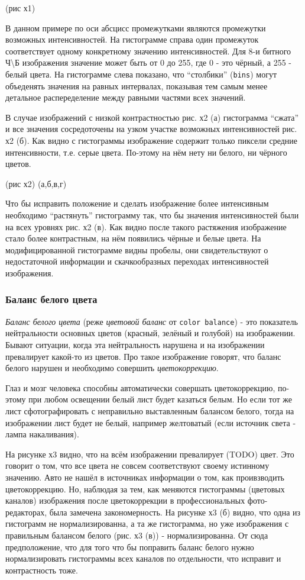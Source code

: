 \documentclass[12pt]{report}
\begin{document}
(рис х1)

В данном примере по оси абсцисс промежутками являются промежутки возможных интенсивностей. На гистограмме справа один промежуток соответствует одному конкретному значению интенсивностей. Для 8-и битного Ч\textbackslash{}Б изображения значение может быть от 0 до 255, где 0 - это чёрный, а 255 - белый цвета. На гистограмме слева показано, что ``столбики'' (\texttt{bins}) могут объеденять значения на равных интервалах, показывая тем самым менее детальное распеределение между равными частями всех значений.

В случае изображений с низкой контрастностью рис. х2 (а) гистограмма ``сжата'' и все значения сосредоточены на узком участке возможных интенсивностей рис. х2 (б). Как видно с гистограммы изображение содержит только пиксели средние интенсивности, т.е. серые цвета. По-этому на нём нету ни белого, ни чёрного цветов.

(рис х2) (а,б,в,г)

Что бы исправить положение и сделать изображение более интенсивным необходимо ``растянуть'' гистограмму так, что бы значения интенсивностей были на всех уровнях рис. х2 (в). Как видно после такого растяжения изображение стало более контрастным, на нём появились чёрные и белые цвета. На модифицированной гистограмме видны пробелы, они свидетельствуют о недостаточной информации и скачкообразных переходах интенсивностей изображения.

\subsubsection{Баланс белого цвета}

\emph{Баланс белого цвета} (реже \emph{цветовой баланс} от \texttt{color balance}) - это показатель нейтральности основных цветов (красный, зелёный и голубой) на изображении. Бывают ситуации, когда эта нейтральность нарушена и на изображении превалирует какой-то из цветов. Про такое изображение говорят, что баланс белого нарушен и необходимо совершить \emph{цветокоррекцию}. 

Глаз и мозг человека способны автоматически совершать цветокоррекцию, по-этому при любом освещении белый лист будет казаться белым. Но если тот же лист сфотографировать с неправильно выставленным балансом белого, тогда на изображении лист будет не белый, например желтоватый (если источник света - лампа накаливания).

На рисунке х3 видно, что на всём изображении превалирует (TODO) цвет. Это говорит о том, что все цвета не совсем соответствуют своему истинному значению. Авто не нашёл  в источниках информации о том, как проивзводить цветокоррекцию. Но, наблюдая за тем, как меняются гистограммы (цветовых каналов) изображения после цветокоррекции в профессиональных фото-редакторах, была замечена закономерность. На рисунке х3 (б) видно, что одна из гистограмм не нормализированна, а та же гистограмма, но уже изображения с правильным балансом белого (рис. х3 (в)) - нормализированна. От сюда предположение, что для того что бы поправить баланс белого нужно нормализировать гистограммы всех каналов по отдельности, что исправит и контрастность тоже.
\end{document}

